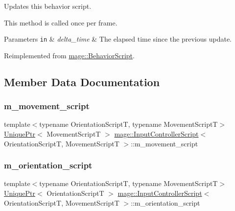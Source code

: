 Updates this behavior script.

This method is called once per frame.


\begin{DoxyParams}[1]{Parameters}
\mbox{\tt in}  & {\em delta\+\_\+time} & The elapsed time since the previous update. \\
\hline
\end{DoxyParams}


Reimplemented from \hyperlink{classmage_1_1_behavior_script_ae42e869ca8d4e4b3ad2af589b0ca9924}{mage\+::\+Behavior\+Script}.



\subsection{Member Data Documentation}
\hypertarget{classmage_1_1_input_controller_script_aea0478602dbabf616dd3ef8b4408a42a}{}\label{classmage_1_1_input_controller_script_aea0478602dbabf616dd3ef8b4408a42a} 
\subsubsection{\texorpdfstring{m\+\_\+movement\+\_\+script}{m\_movement\_script}}
{\footnotesize\ttfamily template$<$typename Orientation\+ScriptT, typename Movement\+ScriptT$>$ \\
\hyperlink{namespacemage_a3316d7143a973e37adf1110f2e80ca31}{Unique\+Ptr}$<$ Movement\+ScriptT $>$ \hyperlink{classmage_1_1_input_controller_script}{mage\+::\+Input\+Controller\+Script}$<$ Orientation\+ScriptT, Movement\+ScriptT $>$\+::m\+\_\+movement\+\_\+script\hspace{0.3cm}{\ttfamily [private]}}

\hypertarget{classmage_1_1_input_controller_script_ab5af05a3bf7cdd672382dd5bcb1d6d02}{}\label{classmage_1_1_input_controller_script_ab5af05a3bf7cdd672382dd5bcb1d6d02} 
\subsubsection{\texorpdfstring{m\+\_\+orientation\+\_\+script}{m\_orientation\_script}}
{\footnotesize\ttfamily template$<$typename Orientation\+ScriptT, typename Movement\+ScriptT$>$ \\
\hyperlink{namespacemage_a3316d7143a973e37adf1110f2e80ca31}{Unique\+Ptr}$<$ Orientation\+ScriptT $>$ \hyperlink{classmage_1_1_input_controller_script}{mage\+::\+Input\+Controller\+Script}$<$ Orientation\+ScriptT, Movement\+ScriptT $>$\+::m\+\_\+orientation\+\_\+script\hspace{0.3cm}{\ttfamily [private]}}

